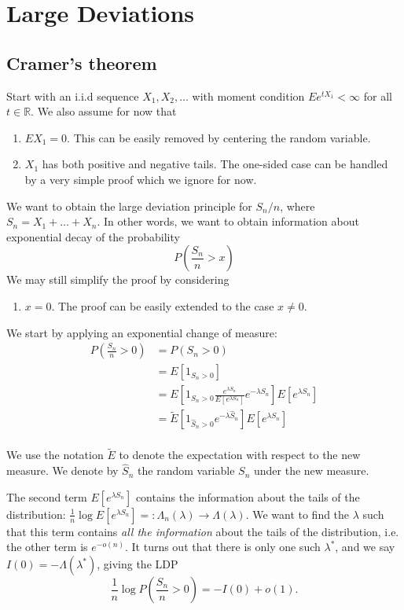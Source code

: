 \section{Large Deviations}

\subsection{Cramer's theorem}

Start with an i.i.d sequence $X_1, X_2, \ldots$ with moment condition $E e^{t X_1} < \infty$ for all $t \in \mathbb{R}$. We also assume for now that
\begin{enumerate}
    \item $E X_1 = 0$. This can be easily removed by centering the random variable.
    \item $X_1$ has both positive and negative tails. The one-sided case can be handled by a very simple proof which we ignore for now.
\end{enumerate}
We want to obtain the large deviation principle for $S_n / n$, where $S_n = X_1 + \ldots + X_n$. In other words, we want to obtain information about exponential decay of the probability
\[
    P\left( \frac{S_n}{n} > x \right)
\]
We may still simplify the proof by considering 
\begin{enumerate}[resume]
    \item $x = 0$. The proof can be easily extended to the case $x \neq 0$.
\end{enumerate}

We start by applying an exponential change of measure:
\begin{align*}
    P\left( \frac{S_n}{n} > 0 \right) &= P\left( S_n > 0 \right) \\
    &= E\left[ 1_{S_n > 0} \right] \\
    &= E\left[ 1_{S_n > 0} \frac{e^{\lambda S_n}}{ E \left[ e^{\lambda S_n} \right]} e^{-\lambda S_n} \right] E \left[ e^{\lambda S_n} \right] \\
    &= \tilde E \left[ 1_{\hat S_n > 0} e^{-\lambda \hat S_n} \right] E \left[ e^{\lambda S_n} \right] \\
\end{align*}

We use the notation $\tilde E$ to denote the expectation with respect to the new measure. We denote by $\hat S_n$ the random variable $S_n$ under the new measure. 

The second term $E \left[ e^{\lambda S_n} \right]$ contains the information about the tails of the distribution: $\frac{1}{n} \log E \left[ e^{\lambda S_n} \right] =: \Lambda_n(\lambda) \to \Lambda(\lambda)$. We want to find the $\lambda$ such that this term contains \textit{all the information} about the tails of the distribution, i.e. the other term is $e^{- o(n)}$. It turns out that there is only one such $\lambda^*$, and we say $I(0) = -\Lambda(\lambda^*)$, giving the LDP 
\[
    \frac{1}{n} \log P\left( \frac{S_n}{n} > 0 \right) = - I(0) + o(1).
\]

